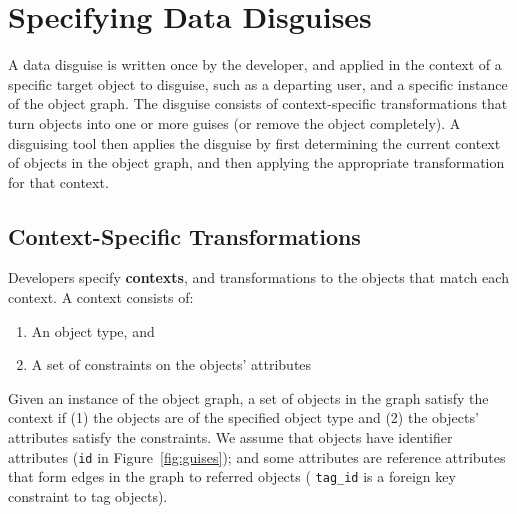 \section{Specifying Data Disguises}
\label{sec:policies}

A data disguise is written once by the developer, and applied in the context of a specific target
object to disguise, such as a departing user, and a specific instance of the object graph.
%
The disguise consists of context-specific transformations that turn objects into one or
more guises (or remove the object completely). 
%
A disguising tool then applies the disguise by first determining the current context of objects in the object
graph, and then applying the appropriate transformation for that context.

\subsection{Context-Specific Transformations}
\label{sec:context}

Developers specify \textbf{contexts}, and transformations to the objects that match each context. 
%
%
%
A context consists of:
\begin{enumerate}[nosep]
    \item An object type, and
    \item A set of constraints on the objects' attributes 
\end{enumerate}
\noindent Given an instance of the object graph, a set of objects in the graph
satisfy the context if (1) the objects are of the specified object type and (2) the objects'
attributes satisfy the constraints.
%
We assume that objects have identifier attributes (\eg \texttt{id} in Figure~\ref{fig:guises}); and
some attributes are reference attributes that form edges in the graph to referred objects (\eg
\texttt{tag\_id} is a foreign key constraint to tag objects).

